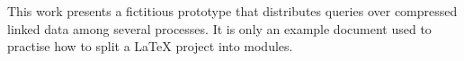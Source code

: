 \begin{otherlanguage}{english}
This work presents a fictitious prototype that distributes queries over
compressed linked data among several processes. It is only an example
document used to practise how to split a \LaTeX{} project into modules.
\end{otherlanguage}
